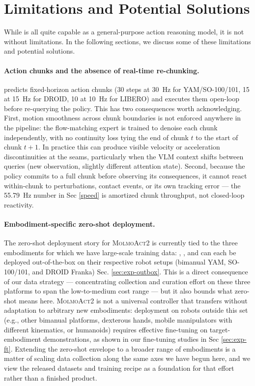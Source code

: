 \section{Limitations and Potential Solutions}
\label{supp:limit}

While \molmoactt is all quite capable as a general-purpose action reasoning model, it is not without limitations. In the following sections, we discuss some of these limitations and potential solutions.

\paragraph{Action chunks and the absence of real-time re-chunking.}
\molmoactt predicts fixed-horizon action chunks (30 steps at 30~Hz for YAM/SO-100/101, 15 at 15~Hz for DROID, 10 at 10~Hz for LIBERO) and executes them open-loop before re-querying the policy. This has two consequences worth acknowledging. First, motion smoothness across chunk boundaries is not enforced anywhere in the pipeline: the flow-matching expert is trained to denoise each chunk independently, with no continuity loss tying the end of chunk $t$ to the start of chunk $t+1$. In practice this can produce visible velocity or acceleration discontinuities at the seams, particularly when the VLM context shifts between queries (new observation, slightly different attention state). Second, because the policy commits to a full chunk before observing its consequences, it cannot react within-chunk to perturbations, contact events, or its own tracking error --- the 55.79~Hz number in Sec \ref{speed} is amortized chunk throughput, not closed-loop reactivity.

\paragraph{Embodiment-specific zero-shot deployment.}
The zero-shot deployment story for \textsc{MolmoAct2} is currently tied to the three embodiments for which we have large-scale training data: \molmoacttyam, \molmoacttso, and \molmoacttdroid can each be deployed out-of-the-box on their respective robot setups (bimanual YAM, SO-100/101, and DROID Franka) Sec. \ref{sec:exp-outbox}. This is a direct consequence of our data strategy --- concentrating collection and curation effort on these three platforms to span the low-to-medium cost range --- but it also bounds what zero-shot means here. \textsc{MolmoAct2} is not a universal controller that transfers without adaptation to arbitrary new embodiments: deployment on robots outside this set (e.g., other bimanual platforms, dexterous hands, mobile manipulators with different kinematics, or humanoids) requires effective fine-tuning on target-embodiment demonstrations, as shown in our fine-tuning studies in Sec \ref{sec:exp-ft}. Extending the zero-shot envelope to a broader range of embodiments is a matter of scaling data collection along the same axes we have begun here, and we view the released datasets and training recipe as a foundation for that effort rather than a finished product.

